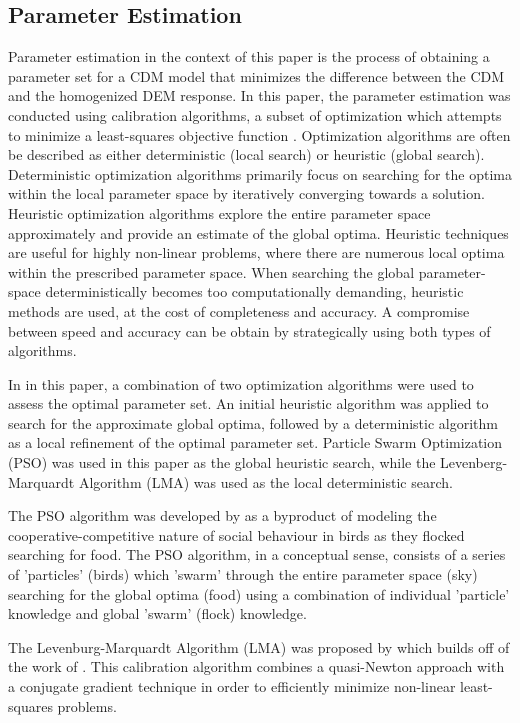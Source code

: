\subsection{Parameter Estimation}
Parameter estimation in the context of this paper is the process of obtaining a parameter set for a CDM model that minimizes the difference between the CDM and the homogenized DEM response. In this paper, the parameter estimation was conducted using calibration algorithms, a subset of optimization which attempts to minimize a least-squares objective function \cite{matott_ostrich:_2008}. Optimization algorithms are often be described as either deterministic (local search) or heuristic (global search). Deterministic optimization algorithms primarily focus on searching for the optima within the local parameter space by iteratively converging towards a solution. Heuristic optimization algorithms explore the entire parameter space approximately and provide an estimate of the global optima. Heuristic techniques are useful for highly non-linear problems, where there are numerous local optima within the prescribed parameter space. When searching the global parameter-space deterministically becomes too computationally demanding, heuristic methods are used, at the cost of completeness and accuracy. A compromise between speed and accuracy can be obtain by strategically using both types of algorithms.

In in this paper, a combination of two optimization algorithms were used  to assess the optimal parameter set. An initial heuristic algorithm was applied to search for the approximate global optima, followed by a deterministic algorithm as a local refinement of the optimal parameter set. Particle Swarm Optimization (PSO) was used in this paper as the global heuristic search, while the Levenberg-Marquardt Algorithm (LMA) was used as the local deterministic search. 

The PSO algorithm was developed by \citet{Kennedy} as a byproduct of modeling the cooperative-competitive nature of social behaviour in birds as they flocked searching for food. The PSO algorithm, in a conceptual sense, consists of a series of 'particles' (birds) which 'swarm' through the entire parameter space (sky) searching for the global optima (food) using a combination of individual 'particle' knowledge and global 'swarm' (flock) knowledge.

The Levenburg-Marquardt Algorithm (LMA) was proposed by \citet{marquardt_algorithm_1963} which builds off of the work of \citet{levenberg_method_1944}. This calibration algorithm combines a quasi-Newton approach with a conjugate gradient technique in order to efficiently minimize non-linear least-squares problems. 

